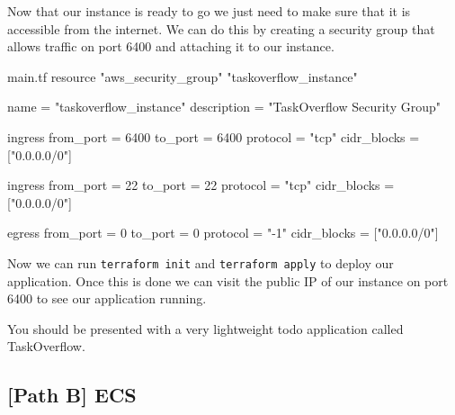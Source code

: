 \documentclass{csse4400}
\begin{document}

Now that our instance is ready to go we just need to make sure that it is accessible from the internet.
We can do this by creating a security group that allows traffic on port 6400 and attaching it to our instance.

\begin{code}[language=terraform,numbers=none]{main.tf}
resource "aws_security_group" "taskoverflow_instance" {
    name = "taskoverflow_instance"
    description = "TaskOverflow Security Group"
  
    ingress {
      from_port = 6400
      to_port = 6400
      protocol = "tcp"
      cidr_blocks = ["0.0.0.0/0"]
    }
  
    ingress {
      from_port = 22
      to_port = 22
      protocol = "tcp"
      cidr_blocks = ["0.0.0.0/0"]
    }
  
    egress {
      from_port = 0
      to_port = 0
      protocol = "-1"
      cidr_blocks = ["0.0.0.0/0"]
    }
}
\end{code}

Now we can run \texttt{terraform init} and \texttt{terraform apply} to deploy our application.
Once this is done we can visit the public IP of our instance on port 6400 to see our application running.


You should be presented with a very lightweight todo application called TaskOverflow.

\subsection{[Path B] ECS}
\label{pathb}

\end{document}
